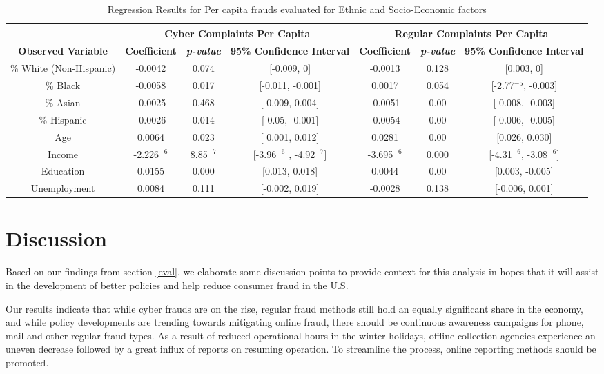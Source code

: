 \documentclass[conference]{IEEEtran}
\begin{document}
\begin{table}[h]
\noindent
\centering
\begin{tabular}{c||c|c|c||c|c|c}
\hline
\multicolumn{1}{c||}{\bfseries } & \multicolumn{3}{c||}{\bfseries Cyber Complaints Per Capita} & \multicolumn{3}{c}{\bfseries Regular Complaints Per Capita}\\
\hline
\bfseries Observed Variable & \bfseries Coefficient & \bfseries \emph{p-value} & \bfseries 95\% Confidence Interval & \bfseries Coefficient & \bfseries \emph{p-value} & \bfseries 95\% Confidence Interval \\
\hline
\% White (Non-Hispanic) & -0.0042 & 0.074 & [-0.009, 0] & -0.0013 &  0.128 & [0.003,  0]\\
\hline
\% Black & -0.0058 & 0.017 & [-0.011, -0.001] & 0.0017 & 0.054 & [-2.77$^{-5}$, -0.003]\\
\hline
\% Asian & -0.0025 & 0.468 & [-0.009, 0.004] & -0.0051 & 0.00 & [-0.008, -0.003]\\
\hline
\% Hispanic & -0.0026 & 0.014 & [-0.05, -0.001] & -0.0054 & 0.00 & [-0.006, -0.005]\\
\hline
Age & 0.0064 & 0.023 & [ 0.001, 0.012] & 0.0281 & 0.00 & [0.026, 0.030]\\
\hline
Income & -2.226$^{-6}$ & 8.85$^{-7}$ & [-3.96$^{-6}$ , -4.92$^{-7}$] & -3.695$^{-6}$ & 0.000  & [-4.31$^{-6}$, -3.08$^{-6}$]\\
\hline
Education & 0.0155 & 0.000 & [0.013, 0.018] & 0.0044 & 0.00 & [0.003, -0.005]\\
\hline
Unemployment & 0.0084 & 0.111 & [-0.002, 0.019] & -0.0028 & 0.138 & [-0.006, 0.001]\\
\hline
\end{tabular}
\vspace{8pt}
\caption{Regression Results for Per capita frauds evaluated for Ethnic and Socio-Economic factors}\label{regressions}
\vspace{-20pt}
\end{table}

\section{Discussion}\label{discussion}
Based on our findings from section \ref{eval}, we elaborate some discussion points to provide context for this analysis in hopes that it will assist in the development of better policies and help reduce consumer fraud in the U.S. 

Our results indicate that while cyber frauds are on the rise, regular fraud methods still hold an equally significant share in the economy, and while policy developments are trending towards mitigating online fraud, there should be continuous awareness campaigns for phone, mail and other regular fraud types. As a result of reduced operational hours in the winter holidays, offline collection agencies experience an uneven decrease followed by a great influx of reports on resuming operation. To streamline the process, online reporting methods should be promoted.
\end{document}
